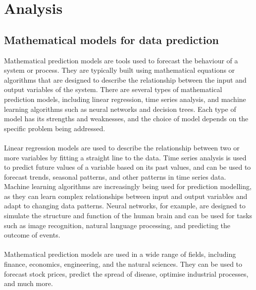\chapter{Analysis}\label{analysis}
      \section{Mathematical models for data prediction}
      Mathematical prediction models are tools used to forecast the behaviour of a system
      or process. They are typically built using mathematical
      equations or algorithms that are designed to describe the relationship between
      the input and output variables of the system.
    There are several types of mathematical prediction models, including linear
    regression, time series analysis, and machine learning algorithms such as neural
    networks and decision trees. Each type of model has its strengths and weaknesses,
    and the choice of model depends on the specific problem being addressed.\\
    \\
    Linear regression models are used to describe the relationship between two or more
    variables by fitting a straight line to the data. Time series analysis is used
    to predict future values of a variable based on its past values, and can be used
    to forecast trends, seasonal patterns, and other patterns in time series data.
    Machine learning algorithms are increasingly being used for prediction modelling,
    as they can learn complex relationships between input and output variables and
    adapt to changing data patterns. Neural networks, for example, are designed
    to simulate the structure and function of the human brain and can be used for
    tasks such as image recognition, natural language processing, and predicting
    the outcome of events.\\
    \\
    Mathematical prediction models are used in a wide range of fields, including
    finance, economics, engineering, and the natural sciences. They can be used
    to forecast stock prices, predict the spread of disease, optimise industrial
    processes, and much more.

